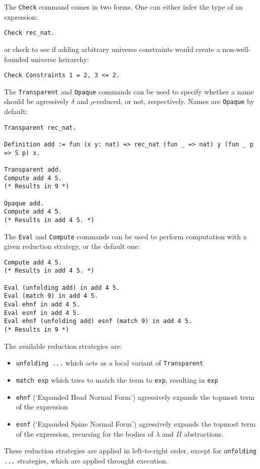 \documentclass{article}
\begin{document}
The \texttt{Check} command comes in two forms. One can either infer the type of an expression:
\begin{lstlisting}
Check rec_nat.
\end{lstlisting}
or check to see if adding arbitrary universe constraints would create a non-well-founded universe heirarchy:
\begin{lstlisting}
Check Constraints 1 = 2, 3 <= 2.
\end{lstlisting}

The \texttt{Transparent} and \texttt{Opaque} commands can be used to specify whether a name should be agressively $\delta$ and $\rho$-reduced, or not, respectively. Names are \texttt{Opaque} by default:
\begin{lstlisting}
Transparent rec_nat.

Definition add := fun (x y: nat) => rec_nat (fun _ => nat) y (fun _ p => S p) x.

Transparent add.
Compute add 4 5.
(* Results in 9 *)

Opaque add.
Compute add 4 5.
(* Results in add 4 5. *)
\end{lstlisting}

The \texttt{Eval} and \texttt{Compute} commands can be used to perform computation with a given reduction strategy, or the default one:
\begin{lstlisting}
Compute add 4 5.
(* Results in add 4 5. *)

Eval (unfolding add) in add 4 5.
Eval (match 9) in add 4 5.
Eval ehnf in add 4 5.
Eval esnf in add 4 5.
Eval ehnf (unfolding add) esnf (match 9) in add 4 5.
(* Results in 9 *)
\end{lstlisting}

The available reduction strategies are:
\begin{itemize}
    \item \texttt{unfolding ...} which acts as a local variant of \texttt{Transparent}
    \item \texttt{match exp} which tries to match the term to \texttt{exp}, resulting in \texttt{exp}
    \item \texttt{ehnf} (`Expanded Head Normal Form') agressively expands the topmost term of the expression
    \item \texttt{esnf} (`Expanded Spine Normal Form') agressively expands the topmost term of the expression, recursing for the bodies of $\lambda$ and $\Pi$ abstractions.
\end{itemize}

These reduction strategies are applied in left-to-right order, except for \texttt{unfolding ...} strategies, which are applied throught execution.
\end{document}

